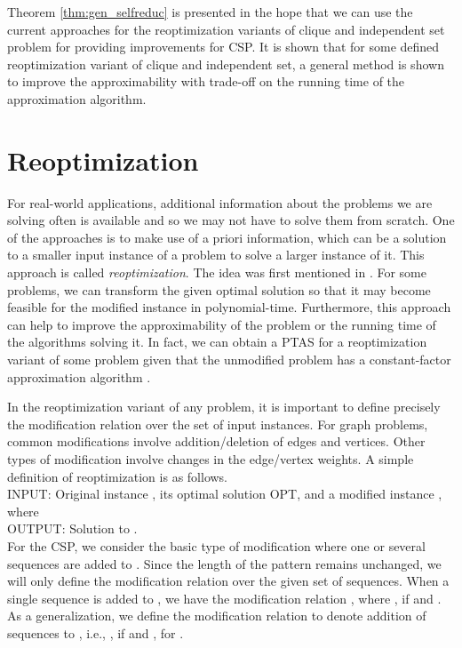 \documentclass[journal]{acm_proc_article-sp}
\begin{document}
Theorem \ref{thm:gen_selfreduc} is presented in the hope that we can use the current approaches for the reoptimization variants of  clique and independent set problem for providing improvements for CSP. It is shown that for some defined reoptimization variant of clique and independent set, a general method is shown to improve the approximability with trade-off on the running time of the approximation algorithm.

\section{Reoptimization}

For real-world applications, additional information about the problems we are solving often is available and so we may not have to solve them from scratch. One of the approaches is to make use of a priori information, which can be a solution to a smaller input instance of a problem to solve a larger instance of it. This approach is called \textit{reoptimization}. The idea was first mentioned in \cite{Schaffter1997}. For some problems, we can transform the given optimal solution so that it may become feasible for the modified instance in polynomial-time. Furthermore, this approach can help to improve the approximability of the problem or the running time of the algorithms solving it. In fact, we can obtain a PTAS for a reoptimization variant of some problem given that the unmodified problem has a constant-factor approximation algorithm \cite{Bockenhauer2008}. 

In the reoptimization variant of any problem, it is important to define precisely the modification relation  over the set of input instances.  For graph problems, common modifications involve addition/deletion of edges and vertices. Other types of modification involve changes in the edge/vertex weights. A simple definition of reoptimization is as follows.\\


\noindent INPUT: Original instance , its optimal solution OPT, and a modified instance , where  \\
\noindent OUTPUT: Solution  to .\\

For the CSP, we consider the basic type of modification where one  or several sequences are added to . Since the length of the pattern remains unchanged, we will only define the modification relation over the given set of sequences. When a single sequence is added to , we have the modification relation , where , if  and . As a generalization, we define the modification relation  to denote addition of  sequences to , i.e., , if  and , for .
\end{document}
